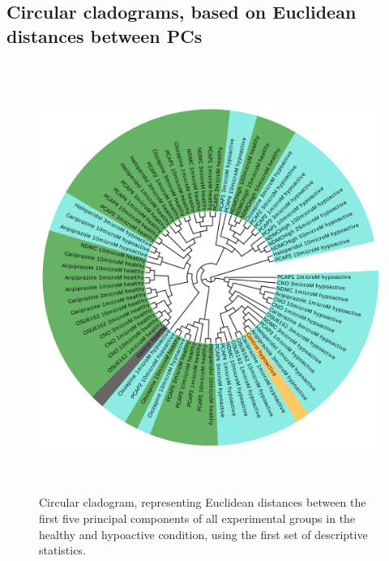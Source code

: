 \documentclass[a4paper,12pt]{article}
\begin{document}
\subsection{Circular cladograms, based on Euclidean distances between PCs}
\newpage
\begin{figure}[h!]
\begin{center}
\includegraphics[width=14cm,height=14cm]{DarkApoLow_set1_PCA_tree_A.png}
\caption{Circular cladogram, representing Euclidean distances between the first five principal components of all experimental groups in the healthy and hypoactive condition, using the first set of descriptive statistics.}
\end{center}
\end{figure}
\newpage
\end{document}
